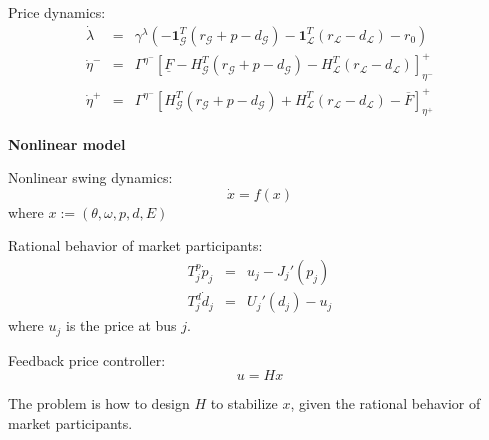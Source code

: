 \documentclass[journal,12pt,onecolumn,draftclsnofoot]{IEEEtran}
\newcommand{\beq}{\begin{equation}}
\newcommand{\eeq}{\end{equation}}
\begin{document}
Price dynamics:
\begin{subequations}
	\begin{eqnarray}
		\label{eq:ctr:1}
		\dot \lambda & = & \gamma^\lambda \left( - \mathbf 1^T_\mathcal{G} (r_\mathcal{G}+p-d_\mathcal{G})  - \mathbf 1^T_\mathcal{L} (r_\mathcal{L}-d_\mathcal{L}) -r_0 \right) \\
		\label{eq:ctr:2}
		\dot \eta^- & = & \Gamma^{\eta^-} \left[\underline{F} - H^T_{\mathcal{G}}(r_\mathcal{G}+p-d_\mathcal{G}) - H^T_\mathcal{L}(r_\mathcal{L}-d_\mathcal{L})  \right]^+_{\eta^-}   \\
		\label{eq:ctr:3}
		\dot \eta^+ & = & \Gamma^{\eta^-} \left[ H^T_{\mathcal{G}}(r_\mathcal{G}+p-d_\mathcal{G}) + H^T_\mathcal{L}(r_\mathcal{L}-d_\mathcal{L}) - \overline{F}  \right]^+_{\eta^+}   
	\end{eqnarray}\label{eq:ctr}%
\end{subequations}

\textbf{Nonlinear model}

Nonlinear swing dynamics:
\beq
\dot x= f(x)
\eeq
where $x:=(\theta,\omega,p,d,E)$

Rational behavior of market participants:
    \begin{eqnarray}
T^p_j \dot p_j & =  & u_j - J_j'(p_j)     \\
T^d_j \dot d_j & =  & U_j'(d_j) -  u_j
\end{eqnarray}%
where $u_j$ is the price at bus $j$.

Feedback price controller:
\beq
u= H x
\eeq

The problem is how to design $H$ to stabilize $x$, given the rational behavior of market participants.





  
  
\end{document}
